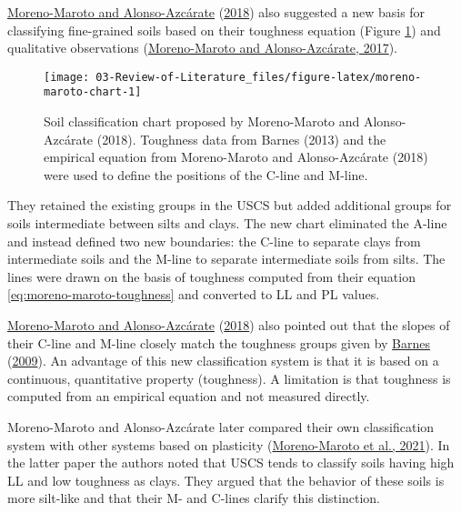 \documentclass[
  letterpaper,
  openany]{book}
\begin{document}
\protect\hyperlink{ref-Moreno-Maroto2018}{Moreno-Maroto and Alonso-Azcárate} (\protect\hyperlink{ref-Moreno-Maroto2018}{2018}) also suggested a new basis for classifying fine-grained soils based on their toughness equation (Figure \ref{fig:moreno-maroto-chart}) and qualitative observations (\protect\hyperlink{ref-Moreno-Maroto2017}{Moreno-Maroto and Alonso-Azcárate, 2017}).

\begin{figure}

{\centering \texttt{[image: 03-Review-of-Literature\_files/figure-latex/moreno-maroto-chart-1]} 

}

\caption[Toughness-based soil classification chart]{Soil classification chart proposed by Moreno-Maroto and Alonso-Azcárate (2018). Toughness data from Barnes (2013) and the empirical equation from Moreno-Maroto and Alonso-Azcárate (2018) were used to define the positions of the C-line and M-line.}\label{fig:moreno-maroto-chart}
\end{figure}

They retained the existing groups in the USCS but added additional groups for soils intermediate between silts and clays.
The new chart eliminated the A-line and instead defined two new boundaries: the C-line to separate clays from intermediate soils and the M-line to separate intermediate soils from silts. The lines were drawn on the basis of toughness computed from their equation \eqref{eq:moreno-maroto-toughness} and converted to LL and PL values.

\protect\hyperlink{ref-Moreno-Maroto2018}{Moreno-Maroto and Alonso-Azcárate} (\protect\hyperlink{ref-Moreno-Maroto2018}{2018}) also pointed out that the slopes of their C-line and M-line closely match the toughness groups given by \protect\hyperlink{ref-Barnes2009}{Barnes} (\protect\hyperlink{ref-Barnes2009}{2009}).
An advantage of this new classification system is that it is based on a continuous, quantitative property (toughness).
A limitation is that toughness is computed from an empirical equation and not measured directly.

Moreno-Maroto and Alonso-Azcárate later compared their own classification system with other systems based on plasticity (\protect\hyperlink{ref-Moreno-Maroto2021}{Moreno-Maroto et al., 2021}).
In the latter paper the authors noted that USCS tends to classify soils having high LL and low toughness as clays. They argued that the behavior of these soils is more silt-like and that their M- and C-lines clarify this distinction.
\end{document}
